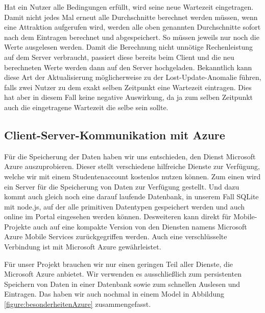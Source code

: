 Hat ein Nutzer alle Bedingungen erfüllt, wird seine neue Wartezeit eingetragen. Damit nicht jedes Mal erneut alle Durchschnitte berechnet werden müssen, wenn eine Attraktion aufgerufen wird, werden alle oben genannten Durchschnitte sofort nach dem Eintragen berechnet und abgespeichert. So müssen jeweils nur noch die Werte ausgelesen werden. Damit die Berechnung nicht unnötige Rechenleistung auf dem Server verbraucht, passiert diese bereits beim Client und die neu berechneten Werte werden dann auf den Server hochgeladen. Bekanntlich kann diese Art der Aktualisierung möglicherweise zu der Lost-Update-Anomalie führen, falls zwei Nutzer zu dem exakt selben Zeitpunkt eine Wartezeit eintragen. Dies hat aber in diesem Fall keine negative Auswirkung, da ja zum selben Zeitpunkt auch die eingetragene Wartezeit die selbe sein sollte.

\subsection{Client-Server-Kommunikation mit Azure}
\label{sec:implementierung:besonderheiten:azure}

Für die Speicherung der Daten haben wir uns entschieden, den Dienst Microsoft Azure auszuprobieren. Dieser stellt verschiedene hilfreiche Dienste zur Verfügung, welche wir mit einem Studentenaccount kostenlos nutzen können. Zum einen wird ein Server für die Speicherung von Daten zur Verfügung gestellt. Und dazu kommt auch gleich noch eine darauf laufende Datenbank, in unserem Fall SQLite mit node.js, auf der alle primitiven Datentypen gespeichert werden und auch online im Portal eingesehen werden können. Desweiteren kann direkt für Mobile-Projekte auch auf eine kompakte Version von den Diensten namens Microsoft Azure Mobile Services zurückgegriffen werden. Auch eine verschlüsselte Verbindung ist mit Microsoft Azure gewährleistet.

Für unser Projekt brauchen wir nur einen geringen Teil aller Dienste, die Microsoft Azure anbietet. Wir verwenden es ausschließlich zum persistenten Speichern von Daten in einer Datenbank sowie zum schnellen Auslesen und Eintragen. Das haben wir auch nochmal in einem Model in Abbildung \ref{figure:besonderheitenAzure} zusammengefasst.

